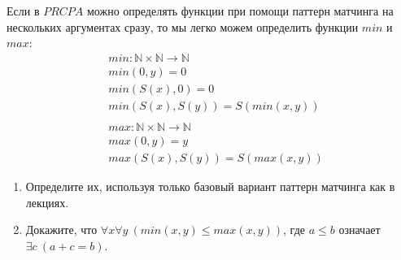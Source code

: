 \begin{task}[2]
	Если в $PRCPA$ можно определять функции при помощи паттерн матчинга на нескольких аргументах сразу, то мы легко можем определить функции $min$ и $max$:
	\begin{align*}
	& min : \mathbb{N} \times \mathbb{N} \to \mathbb{N} \\
	& min(0,y) = 0 \\
	& min(S(x),0) = 0 \\
	& min(S(x),S(y)) = S(min(x,y)) \\
	& \\
	& max : \mathbb{N} \times \mathbb{N} \to \mathbb{N} \\
	& max(0,y) = y \\
	& max(S(x),S(y)) = S(max(x,y))
	\end{align*}
	\begin{enumerate}
	\item Определите их, используя только базовый вариант паттерн матчинга как в лекциях.
	\item Докажите, что $\forall x \forall y\ (min(x,y) \leq max(x,y))$, где $a \leq b$ означает $\exists c\ (a + c = b)$.
	\end{enumerate}
\end{task}
